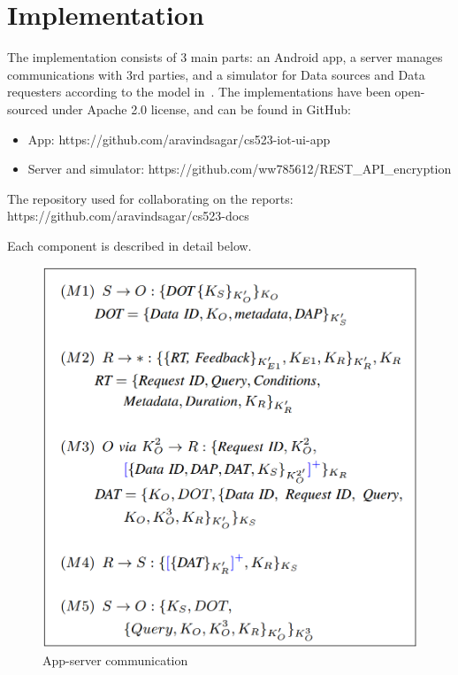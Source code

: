 \documentclass[conference]{IEEEtran}
\begin{document}
\section{Implementation}
The implementation consists of 3 main parts: an Android app, a server manages communications with 3rd parties, and a simulator for Data sources and Data requesters according to the model in~\cite{campbell}. The implementations have been open-sourced under Apache 2.0 license, and can be found in GitHub:
\begin{itemize}
	\item App: https://github.com/\linebreak[0]aravindsagar/\linebreak[0]cs523-iot-ui-app
	\item Server and simulator: https://github.com/\linebreak[0]ww785612/\linebreak[0]REST\_API\_encryption
\end{itemize}

The repository used for collaborating on the reports: https://github.com/\linebreak[0]aravindsagar/\linebreak[0]cs523-docs

Each component is described in detail below.

\begin{figure}[t]
	\includegraphics[width=0.95\linewidth]{message_protocol.png}
	\caption{App-server communication}
	\label{fig:app_server_comm}
\end{figure}
\end{document}
